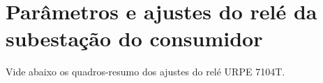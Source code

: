 \section{Parâmetros e ajustes do relé da subestação do consumidor}

Vide abaixo os quadros-resumo dos ajustes do relé URPE 7104T.



